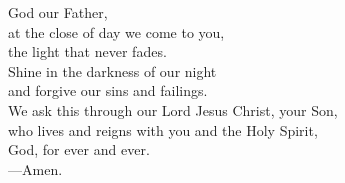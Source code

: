 \prayer


\begin{prayerverse}
God our Father,\\
at the close of day we come to you,\\
the light that never fades.\\
Shine in the darkness of our night\\
and forgive our sins and failings.\\
We ask this through our Lord Jesus Christ, your Son,\\
who lives and reigns with you and the Holy Spirit,\\
God, for ever and ever.\\
{\color{red}---\thinspace}Amen.
\end{prayerverse}

